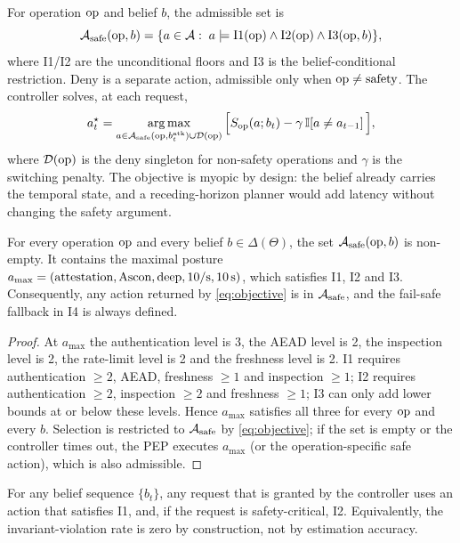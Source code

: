 For operation $\mathrm{op}$ and belief $b$, the admissible set is
\begin{equation}
  \mathcal{A}_{\mathrm{safe}}(\mathrm{op},b)=\{a\in\mathcal{A}:\; a\models \mathrm{I1}(\mathrm{op})\land \mathrm{I2}(\mathrm{op})
  \land \mathrm{I3}(\mathrm{op},b)\},
  \label{eq:admissible}
\end{equation}
where I1/I2 are the unconditional floors and I3 is the belief-conditional
restriction. Deny is a separate action, admissible only when
$\mathrm{op}\neq\text{safety}$. The controller solves, at each request,
\begin{equation}
  a_t^{\star}=\operatorname*{arg\,max}_{a\in\mathcal{A}_{\mathrm{safe}}(\mathrm{op},b^{\mathrm{atk}}_t)\cup\mathcal{D}(\mathrm{op})}
  \Big[S_{\mathrm{op}}(a;b_t)-\gamma\,\mathbb{I}\!\left[a\neq a_{t-1}\right]\Big],
  \label{eq:objective}
\end{equation}
where $\mathcal{D}(\mathrm{op})$ is the deny singleton for non-safety operations and
$\gamma$ is the switching penalty. The objective is myopic by design: the belief
already carries the temporal state, and a receding-horizon planner would add
latency without changing the safety argument.

\begin{proposition}
\label{prop:dominance}
For every operation $\mathrm{op}$ and every belief $b\in\Delta(\Theta)$, the set
$\mathcal{A}_{\mathrm{safe}}(\mathrm{op},b)$ is non-empty. It contains the maximal posture
$a_{\max}=(\text{attestation},\text{Ascon},\text{deep},\text{10/s},\text{10\,s})$,
which satisfies I1, I2 and I3. Consequently, any action returned by
\eqref{eq:objective} is in $\mathcal{A}_{\mathrm{safe}}$, and the fail-safe fallback in I4 is always
defined.
\end{proposition}

\begin{proof}
At $a_{\max}$ the authentication level is 3, the AEAD level is 2, the inspection
level is 2, the rate-limit level is 2 and the freshness level is 2. I1 requires
authentication $\ge 2$, AEAD, freshness $\ge 1$ and inspection $\ge 1$; I2
requires authentication $\ge 2$, inspection $\ge 2$ and freshness $\ge 1$; I3
can only add lower bounds at or below these levels. Hence $a_{\max}$ satisfies
all three for every $\mathrm{op}$ and every $b$. Selection is restricted to $\mathcal{A}_{\mathrm{safe}}$ by
\eqref{eq:objective}; if the set is empty or the controller times out, the PEP
executes $a_{\max}$ (or the operation-specific safe action), which is also
admissible.
\end{proof}

\begin{proposition}
\label{prop:structural}
For any belief sequence $\{b_t\}$, any request that is granted by the controller
uses an action that satisfies I1, and, if the request is safety-critical, I2.
Equivalently, the invariant-violation rate is zero by construction, not by
estimation accuracy.
\end{proposition}

